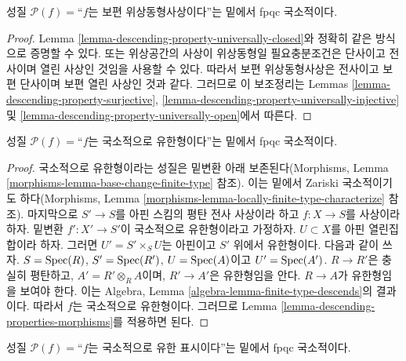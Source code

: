 \begin{lemma}
\label{lemma-descending-property-universal-homeomorphism}
성질 $\mathcal{P}(f) =$“$f$는 보편 위상동형사상이다”는 밑에서 fpqc
국소적이다.
\end{lemma}

\begin{proof}
Lemma \ref{lemma-descending-property-universally-closed}와 정확히 같은
방식으로 증명할 수 있다. 또는 위상공간의 사상이 위상동형일
필요충분조건은 단사이고 전사이며 열린 사상인 것임을 사용할 수 있다.
따라서 보편 위상동형사상은 전사이고 보편 단사이며 보편 열린 사상인 것과
같다. 그러므로 이 보조정리는 Lemmas
\ref{lemma-descending-property-surjective},
\ref{lemma-descending-property-universally-injective} 및
\ref{lemma-descending-property-universally-open}에서 따른다.
\end{proof}

\begin{lemma}
\label{lemma-descending-property-locally-finite-type}
성질 $\mathcal{P}(f) =$“$f$는 국소적으로 유한형이다”는 밑에서 fpqc
국소적이다.
\end{lemma}

\begin{proof}
국소적으로 유한형이라는 성질은 밑변환 아래 보존된다(Morphisms, Lemma
\ref{morphisms-lemma-base-change-finite-type} 참조). 이는 밑에서 Zariski
국소적이기도 하다(Morphisms, Lemma
\ref{morphisms-lemma-locally-finite-type-characterize} 참조).
마지막으로 $S' \to S$를 아핀 스킴의 평탄 전사 사상이라 하고
$f : X \to S$를 사상이라 하자. 밑변환 $f' : X' \to S'$이 국소적으로
유한형이라고 가정하자. $U \subset X$를 아핀 열린집합이라 하자. 그러면
$U' = S' \times_S U$는 아핀이고 $S'$ 위에서 유한형이다. 다음과 같이
쓰자.
$S = \mathop{\mathrm{Spec}}(R)$,
$S' = \mathop{\mathrm{Spec}}(R')$,
$U = \mathop{\mathrm{Spec}}(A)$이고
$U' = \mathop{\mathrm{Spec}}(A')$.
$R \to R'$은 충실히 평탄하고, $A' = R' \otimes_R A$이며,
$R' \to A'$은 유한형임을 안다. $R \to A$가 유한형임을 보여야 한다.
이는 Algebra, Lemma \ref{algebra-lemma-finite-type-descends}의 결과이다.
따라서 $f$는 국소적으로 유한형이다. 그러므로 Lemma
\ref{lemma-descending-properties-morphisms}를 적용하면 된다.
\end{proof}

\begin{lemma}
\label{lemma-descending-property-locally-finite-presentation}
성질 $\mathcal{P}(f) =$“$f$는 국소적으로 유한 표시이다”는 밑에서 fpqc
국소적이다.
\end{lemma}

